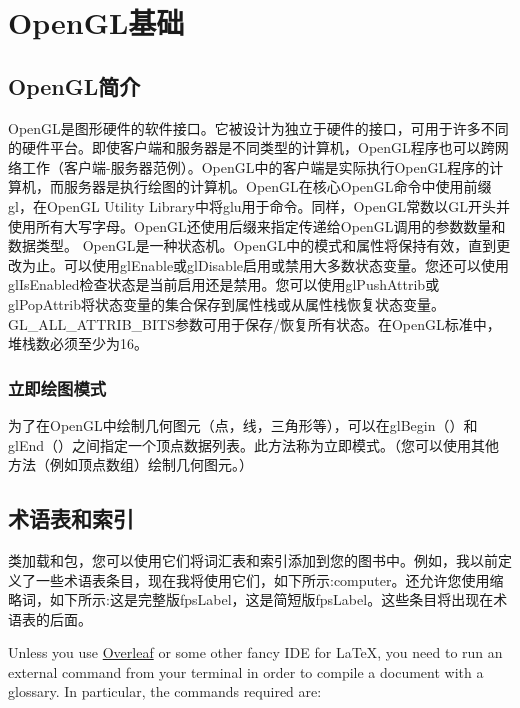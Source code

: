 \chapter{OpenGL基础}

\section{OpenGL简介}

OpenGL是图形硬件的软件接口。它被设计为独立于硬件的接口，可用于许多不同的硬件平台。即使客户端和服务器是不同类型的计算机，OpenGL程序也可以跨网络工作（客户端-服务器范例）。OpenGL中的客户端是实际执行OpenGL程序的计算机，而服务器是执行绘图的计算机。OpenGL在核心OpenGL命令中使用前缀gl，在OpenGL Utility Library中将glu用于命令。同样，OpenGL常数以GL开头并使用所有大写字母。OpenGL还使用后缀来指定传递给OpenGL调用的参数数量和数据类型。
OpenGL是一种状态机。OpenGL中的模式和属性将保持有效，直到更改为止。可以使用glEnable或glDisable启用或禁用大多数状态变量。您还可以使用glIsEnabled检查状态是当前启用还是禁用。您可以使用glPushAttrib或glPopAttrib将状态变量的集合保存到属性栈或从属性栈恢复状态变量。GL_ALL_ATTRIB_BITS参数可用于保存/恢复所有状态。在OpenGL标准中，堆栈数必须至少为16。

\subsection{立即绘图模式}
为了在OpenGL中绘制几何图元（点，线，三角形等），可以在glBegin（）和glEnd（）之间指定一个顶点数据列表。此方法称为立即模式。（您可以使用其他方法（例如顶点数组）绘制几何图元。）

\section{术语表和索引}

类加载和包，您可以使用它们将词汇表和索引添加到您的图书中。例如，我以前定义了一些术语表条目，现在我将使用它们，如下所示:\gls{computer}。还允许您使用缩略词，如下所示:这是完整版\acrfull{fpsLabel}，这是简短版\acrshort{fpsLabel}。这些条目将出现在术语表的后面。

Unless you use \href{https://www.overleaf.com}{Overleaf} or some other 
fancy IDE for \LaTeX, you need to run an external command from your 
terminal in order to compile a document with a glossary. In particular, 
the commands required are:

